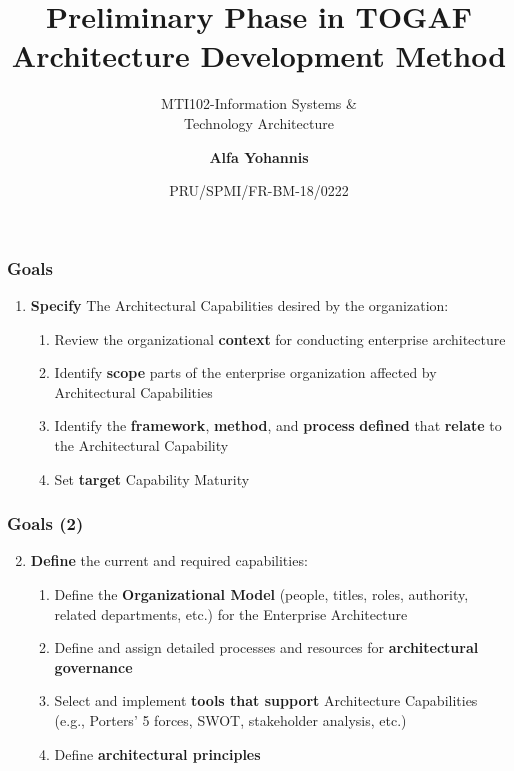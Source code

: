 \documentclass[aspectratio=169, table]{beamer}
\subtitle{MTI102-Information Systems \&\\Technology Architecture}
\title{Preliminary Phase in TOGAF\\Architecture Development Method}
\date[Serial]{\scriptsize {PRU/SPMI/FR-BM-18/0222}}
\author[Pradita]{\small {\textbf{Alfa Yohannis}}}
\begin{document}
    \frame{\titlepage}



    \begin{frame}
        \frametitle{Goals}
        \begin{enumerate}
            \item \textbf{Specify} The Architectural Capabilities desired by the organization:
            \begin{enumerate}
                \item Review the organizational \textbf{context} for conducting enterprise architecture
                \item Identify \textbf{scope} parts of the enterprise organization affected by Architectural Capabilities
                \item Identify the \textbf{framework}, \textbf{method}, and \textbf{process} \textbf{defined} that \textbf{relate} to the Architectural Capability
                \item Set \textbf{target} Capability Maturity
            \end{enumerate}
        \end{enumerate}
    \end{frame}

    \begin{frame}
        \frametitle{Goals (2)}
        \begin{enumerate}
            \setcounter{enumi}{1}
            \item \textbf{Define} the current and required capabilities:
            \begin{enumerate}
                \item Define the \textbf{Organizational Model} (people, titles, roles, authority, related departments, etc.) for the Enterprise Architecture
                \item Define and assign detailed processes and resources for \textbf{architectural governance}
                \item Select and implement \textbf{tools that support} Architecture Capabilities (e.g., Porters' 5 forces, SWOT, stakeholder analysis, etc.)
                \item Define \textbf{architectural principles}
            \end{enumerate}
        \end{enumerate}
    \end{frame}
\end{document}
